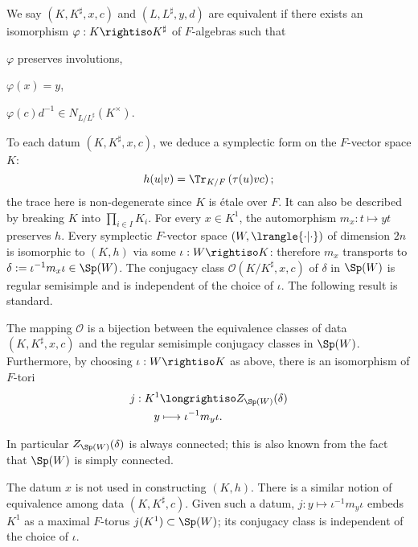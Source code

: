 \documentclass[a4paper,10pt]{article}
\begin{document}
We say $(K, K^\sharp, x, c)$ and $(L, L^\sharp, y, d)$ are equivalent if there exists an isomorphism $\varphi: K \rightiso K^\sharp$ of $F$-algebras such that
\begin{compactitem}
	\item $\varphi$ preserves involutions,
	\item $\varphi(x)=y$,
	\item $\varphi(c)d^{-1} \in N_{L/L^\sharp}(K^\times)$.
\end{compactitem}
To each datum $(K, K^\sharp, x, c)$, we deduce a symplectic form on the $F$-vector space $K$:
\begin{equation}\label{eqn:K-symp-form}
	h(u|v) = \Tr_{K/F}\left( \tau(u)vc \right);
\end{equation}
the trace here is non-degenerate since $K$ is étale over $F$. It can also be described by breaking $K$ into $\prod_{i \in I} K_i$. For every $x \in K^1$, the automorphism $m_x: t \mapsto yt$ preserves $h$. Every symplectic $F$-vector space $(W, \lrangle{\cdot|\cdot})$ of dimension $2n$ is isomorphic to $(K, h)$ via some $\iota: W \rightiso K$: therefore $m_x$ transports to $\delta := \iota^{-1} m_x \iota \in \Sp(W)$. The conjugacy class $\mathcal{O}(K/K^\sharp, x, c)$ of $\delta$ in $\Sp(W)$ is regular semisimple and is independent of the choice of $\iota$. The following result is standard.

\begin{proposition}\label{prop:reg-ss-parameters}
	The mapping $\mathcal{O}$ is a bijection between the equivalence classes of data $(K, K^\sharp, x, c)$ and the regular semisimple conjugacy classes in $\Sp(W)$. Furthermore, by choosing $\iota: W \rightiso K$ as above, there is an isomorphism of $F$-tori
	\begin{align*}
		j: K^1 & \longrightiso Z_{\Sp(W)}(\delta) \\
		y & \longmapsto \iota^{-1} m_y \iota.
	\end{align*}
\end{proposition}
In particular $Z_{\Sp(W)}(\delta)$ is always connected; this is also known from the fact that $\Sp(W)$ is simply connected.

The datum $x$ is not used in constructing $(K,h)$. There is a similar notion of equivalence among data $(K, K^\sharp, c)$. Given such a datum, $j: y \mapsto \iota^{-1} m_y \iota$ embeds $K^1$ as a maximal $F$-torus $j(K^1) \subset \Sp(W)$; its conjugacy class is independent of the choice of $\iota$.
\end{document}
